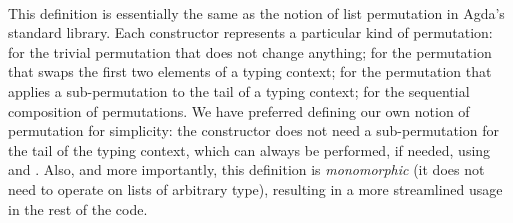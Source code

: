 \begin{code}
\AgdaSymbol{)}\AgdaSpace{}%
\AgdaOperator{\AgdaDatatype{\#}}\AgdaSpace{}%
\AgdaSymbol{(}\AgdaSpace{}%
\AgdaSpace{}%
\AgdaSymbol{)}\<%
\\
%
\>[2]%
\>[9]\AgdaSymbol{:}\AgdaSpace{}%
\AgdaSpace{}%
\AgdaSpace{}%
\AgdaSymbol{\}}\AgdaSpace{}%
\AgdaSpace{}%
\AgdaSpace{}%
\AgdaOperator{\AgdaDatatype{\#}}\AgdaSpace{}%
\AgdaSpace{}%
\AgdaSpace{}%
\AgdaSpace{}%
\AgdaOperator{\AgdaDatatype{\#}}\AgdaSpace{}%
\AgdaSpace{}%
\AgdaSpace{}%
\AgdaSpace{}%
\AgdaOperator{\AgdaDatatype{\#}}\AgdaSpace{}%
\<%
\end{code}

This definition is essentially the same as the notion of list permutation in
Agda's standard library. Each constructor represents a particular kind of
permutation:  for the trivial permutation that
does not change anything;  for the permutation
that swaps the first two elements of a typing context;
 for the permutation that applies a
sub-permutation to the tail of a typing context;
 for the sequential composition of
permutations.
%
We have preferred defining our own notion of permutation for simplicity: the
 constructor does not need a sub-permutation
for the tail of the typing context, which can always be performed, if needed,
using  and .
Also, and more importantly, this definition is \emph{monomorphic} (it does not
need to operate on lists of arbitrary type), resulting in a more streamlined
usage in the rest of the code.

